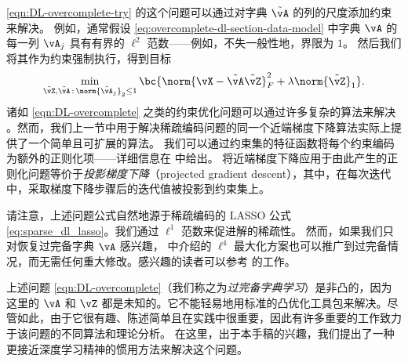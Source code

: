\documentclass[../../book-main_zh.tex]{subfiles}
\begin{document}
    \eqref{eqn:DL-overcomplete-try} 的这个问题可以通过对字典 $\tilde{\vA}$ 的列的尺度添加约束来解决。
    例如，通常假设 \eqref{eq:overcomplete-dl-section-data-model} 中字典 $\vA$
    的每一列 $\vA_j$ 具有有界的 $\ell^2$ 范数——例如，不失一般性地，界限为 $1$。
    然后我们将其作为约束强制执行，得到目标
    \begin{equation}
        \min_{\tilde{\vZ}, \tilde{\vA} \,:\, \norm{\tilde{\vA}_j}_2 \leq 1}
        \bc{\norm{\vX - \tilde{\vA}\tilde{\vZ}}_{F}^{2} + \lambda
        \norm{\tilde{\vZ}}_{1}}.
        \label{eqn:DL-overcomplete}
    \end{equation}
    诸如 \eqref{eqn:DL-overcomplete} 之类的约束优化问题可以通过许多复杂的算法来解决
    \cite{nocedal2006numerical}。然而，我们上一节中用于解决稀疏编码问题的同一个近端梯度下降算法实际上提供了一个简单且可扩展的算法。
    我们可以通过约束集的特征函数将每个约束编码为额外的正则化项——详细信息在
     中给出。
    将近端梯度下降应用于由此产生的正则化问题等价于\textit{投影梯度下降}（projected gradient
    descent），其中，在每次迭代中，采取梯度下降步骤后的迭代值被投影到约束集上。

    \begin{remark}
        请注意，上述问题公式自然地源于稀疏编码的 LASSO 公式 \eqref{eq:sparse_dl_lasso}。我们通过
        \(\ell^1\) 范数来促进解的稀疏性。
        然而，如果我们只对恢复过完备字典 \(\vA\) 感兴趣，
        中介绍的 \(\ell^4\) 最大化方案也可以推广到过完备情况，而无需任何重大修改。感兴趣的读者可以参考
        \cite{Qu2020Geometric} 的工作。
    \end{remark}

    上述问题 \eqref{eqn:DL-overcomplete}（我们称之为\textit{过完备字典学习}）是非凸的，因为这里的
    \(\vA\) 和 \(\vZ\)
    都是未知的。它不能轻易地用标准的凸优化工具包来解决。尽管如此，由于它很有趣、陈述简单且在实践中很重要，因此有许多重要的工作致力于该问题的不同算法和理论分析。
    在这里，出于本手稿的兴趣，我们提出了一种更接近深度学习精神的惯用方法来解决这个问题。
\end{document}
